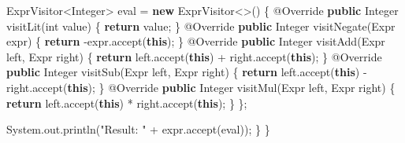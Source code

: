 \documentclass[]{article}
\newenvironment{Shaded}{}{}
\newcommand{\AttributeTok}[1]{\textcolor[rgb]{0.49,0.56,0.16}{#1}}
\newcommand{\BuiltInTok}[1]{\textcolor[rgb]{0.00,0.50,0.00}{#1}}
\newcommand{\ControlFlowTok}[1]{\textcolor[rgb]{0.00,0.44,0.13}{\textbf{#1}}}
\newcommand{\DataTypeTok}[1]{\textcolor[rgb]{0.56,0.13,0.00}{#1}}
\newcommand{\FunctionTok}[1]{\textcolor[rgb]{0.02,0.16,0.49}{#1}}
\newcommand{\KeywordTok}[1]{\textcolor[rgb]{0.00,0.44,0.13}{\textbf{#1}}}
\newcommand{\NormalTok}[1]{#1}
\newcommand{\OperatorTok}[1]{\textcolor[rgb]{0.40,0.40,0.40}{#1}}
\newcommand{\StringTok}[1]{\textcolor[rgb]{0.25,0.44,0.63}{#1}}
\begin{document}
\begin{Shaded}
\begin{Highlighting}[]
\NormalTok{        ExprVisitor}\OperatorTok{\textless{}}\BuiltInTok{Integer}\OperatorTok{\textgreater{}}\NormalTok{ eval }\OperatorTok{=} \KeywordTok{new}\NormalTok{ ExprVisitor}\OperatorTok{\textless{}\textgreater{}()} \OperatorTok{\{}
            \AttributeTok{@Override} \KeywordTok{public} \BuiltInTok{Integer} \FunctionTok{visitLit}\OperatorTok{(}\DataTypeTok{int}\NormalTok{ value}\OperatorTok{)} \OperatorTok{\{} \ControlFlowTok{return}\NormalTok{ value}\OperatorTok{;} \OperatorTok{\}}
            \AttributeTok{@Override} \KeywordTok{public} \BuiltInTok{Integer} \FunctionTok{visitNegate}\OperatorTok{(}\NormalTok{Expr expr}\OperatorTok{)} \OperatorTok{\{} \ControlFlowTok{return} \OperatorTok{{-}}\NormalTok{expr}\OperatorTok{.}\FunctionTok{accept}\OperatorTok{(}\KeywordTok{this}\OperatorTok{);} \OperatorTok{\}}
            \AttributeTok{@Override} \KeywordTok{public} \BuiltInTok{Integer} \FunctionTok{visitAdd}\OperatorTok{(}\NormalTok{Expr left}\OperatorTok{,}\NormalTok{ Expr right}\OperatorTok{)} \OperatorTok{\{} \ControlFlowTok{return}\NormalTok{ left}\OperatorTok{.}\FunctionTok{accept}\OperatorTok{(}\KeywordTok{this}\OperatorTok{)} \OperatorTok{+}\NormalTok{ right}\OperatorTok{.}\FunctionTok{accept}\OperatorTok{(}\KeywordTok{this}\OperatorTok{);} \OperatorTok{\}}
            \AttributeTok{@Override} \KeywordTok{public} \BuiltInTok{Integer} \FunctionTok{visitSub}\OperatorTok{(}\NormalTok{Expr left}\OperatorTok{,}\NormalTok{ Expr right}\OperatorTok{)} \OperatorTok{\{} \ControlFlowTok{return}\NormalTok{ left}\OperatorTok{.}\FunctionTok{accept}\OperatorTok{(}\KeywordTok{this}\OperatorTok{)} \OperatorTok{{-}}\NormalTok{ right}\OperatorTok{.}\FunctionTok{accept}\OperatorTok{(}\KeywordTok{this}\OperatorTok{);} \OperatorTok{\}}
            \AttributeTok{@Override} \KeywordTok{public} \BuiltInTok{Integer} \FunctionTok{visitMul}\OperatorTok{(}\NormalTok{Expr left}\OperatorTok{,}\NormalTok{ Expr right}\OperatorTok{)} \OperatorTok{\{} \ControlFlowTok{return}\NormalTok{ left}\OperatorTok{.}\FunctionTok{accept}\OperatorTok{(}\KeywordTok{this}\OperatorTok{)} \OperatorTok{*}\NormalTok{ right}\OperatorTok{.}\FunctionTok{accept}\OperatorTok{(}\KeywordTok{this}\OperatorTok{);} \OperatorTok{\}}
        \OperatorTok{\};}

        \BuiltInTok{System}\OperatorTok{.}\FunctionTok{out}\OperatorTok{.}\FunctionTok{println}\OperatorTok{(}\StringTok{"Result: "} \OperatorTok{+}\NormalTok{ expr}\OperatorTok{.}\FunctionTok{accept}\OperatorTok{(}\NormalTok{eval}\OperatorTok{));}
    \OperatorTok{\}}
\OperatorTok{\}}
\end{Highlighting}
\end{Shaded}
\end{document}
